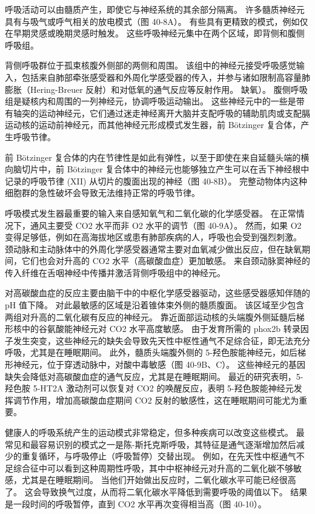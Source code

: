 呼吸活动可以由髓质产生，即使它与神经系统的其余部分隔离。 许多髓质神经元具有与吸气或呼气相关的放电模式（图 40-8A）。 有些具有更精致的模式，例如仅在早期灵感或晚期灵感时触发。 这些呼吸神经元集中在两个区域，即背侧和腹侧呼吸组。

背侧呼吸群位于孤束核腹外侧部的两侧和周围。 该组中的神经元接受呼吸感觉输入，包括来自肺部牵张感受器和外周化学感受器的传入，并参与诸如限制高容量肺膨胀（Hering-Breuer 反射）和对低氧的通气反应等反射作用。 缺氧）。 腹侧呼吸组是疑核内和周围的一列神经元，协调呼吸运动输出。 这些神经元中的一些是带有轴突的运动神经元，它们通过迷走神经离开大脑并支配呼吸的辅助肌肉或支配膈运动核的运动前神经元，而其他神经元形成模式发生器，前 Bötzinger 复合体，产生呼吸节律。

前 Bötzinger 复合体的内在节律性是如此有弹性，以至于即使在来自延髓头端的横向脑切片中，前 Bötzinger 复合体中的神经元也能够独立产生可以在舌下神经根中记录的呼吸节律 (XII) 从切片的腹面出现的神经（图 40-8B）。 完整动物体内这种细胞群的急性破坏会导致无法维持正常的呼吸节律。

呼吸模式发生器最重要的输入来自感知氧气和二氧化碳的化学感受器。 在正常情况下，通风主要受 CO2 水平而非 O2 水平的调节（图 40-9A）。 然而，如果 O2 变得足够低，例如在高海拔地区或患有肺部疾病的人，呼吸也会受到强烈刺激。 颈动脉和主动脉体中的外周化学感受器通常主要对血氧减少做出反应，但在缺氧期间，它们也会对升高的 CO2 水平（高碳酸血症）更加敏感。 来自颈动脉窦神经的传入纤维在舌咽神经中传播并激活背侧呼吸组中的神经元。

对高碳酸血症的反应主要由脑干中的中枢化学感受器驱动，这些感受器感知伴随的 pH 值下降。 对此最敏感的区域是沿着锥体束外侧的髓质腹面。 该区域至少包含两组对升高的二氧化碳有反应的神经元。 靠近面部运动核的头端腹外侧延髓后梯形核中的谷氨酸能神经元对 CO2 水平高度敏感。 由于发育所需的 phox2b 转录因子发生突变，这些神经元的缺失会导致先天性中枢性通气不足综合征，即无法充分呼吸，尤其是在睡眠期间。 此外，髓质头端腹外侧的 5-羟色胺能神经元，如后梯形神经元，位于穿透动脉中，对酸中毒敏感（图 40-9B、C）。 这些神经元的基因缺失会降低对高碳酸血症的通气反应，尤其是在睡眠期间。 最近的研究表明，5-羟色胺 5-HT2A 激动剂可以恢复对 CO2 的唤醒反应，表明 5-羟色胺能神经元发挥调节作用，增加高碳酸血症期间 CO2 反射的敏感性，这在睡眠期间可能尤为重要。

健康人的呼吸系统产生的运动模式非常稳定，但多种疾病可以改变这些模式。 最常见和最容易识别的模式之一是陈-斯托克斯呼吸，其特征是通气逐渐增加然后减少的重复循环，与呼吸停止（呼吸暂停）交替出现。 例如，在先天性中枢通气不足综合征中可以看到这种周期性呼吸，其中中枢神经元对升高的二氧化碳不够敏感，尤其是在睡眠期间。 当他们开始做出反应时，二氧化碳水平可能已经很高了。 这会导致换气过度，从而将二氧化碳水平降低到需要呼吸的阈值以下。 结果是一段时间的呼吸暂停，直到 CO2 水平再次变得相当高（图 40-10）。

